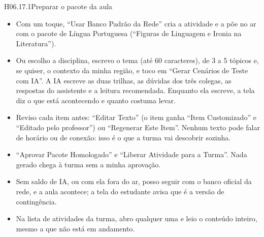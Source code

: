\begin{historia}{H06.17.1}{Preparar o pacote da aula}{\pronto}
\aceite
\begin{itemize}
  \item Com um toque, \enquote{Usar Banco Padrão da Rede} cria a atividade e a
    põe no ar com o pacote de Língua Portuguesa (\enquote{Figuras de
    Linguagem e Ironia na Literatura}).
  \item Ou escolho a disciplina, escrevo o tema (até 60 caracteres), de 3 a 5
    tópicos e, se quiser, o contexto da minha região, e toco em
    \enquote{Gerar Cenários de Teste com IA}. A IA escreve as duas trilhas,
    as dúvidas dos três colegas, as respostas do assistente e a leitura
    recomendada. Enquanto ela escreve, a tela diz o que está acontecendo e
    quanto costuma levar.
  \item Reviso cada item antes: \enquote{Editar Texto} (o item ganha
    \enquote{Item Customizado} e \enquote{Editado pelo professor}) ou
    \enquote{Regenerar Este Item}. Nenhum
    texto pode falar de horário ou de conexão: isso é o que a turma vai
    descobrir sozinha.
  \item \enquote{Aprovar Pacote Homologado} e \enquote{Liberar Atividade para
    a Turma}. Nada gerado chega à turma sem a minha aprovação.
  \item Sem saldo de IA, ou com ela fora do ar, posso seguir com o banco
    oficial da rede, e a aula acontece; a tela do estudante avisa que é a
    versão de contingência.
  \item Na lista de atividades da turma, abro qualquer uma e leio o conteúdo
    inteiro, mesmo a que não está em andamento.
\end{itemize}
\end{historia}

